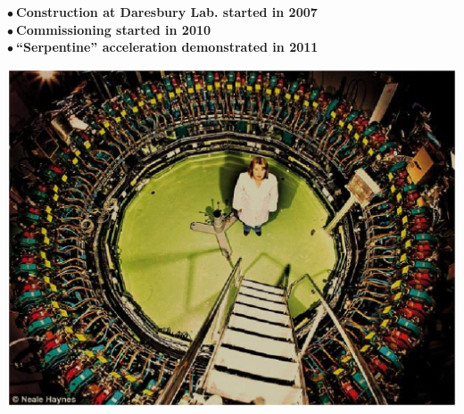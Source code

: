 \documentclass[12pt]{article}
\newcommand{\nib}{\noindent \ensuremath{\bullet~}}
\newcommand{\blue}{\color{blue}}
\begin{document}
\begin{minipage}{.5\linewidth}

{\Large \blue \bf
\noindent
\nib Construction at Daresbury Lab.  started in 2007 \\[1ex]
\nib Commissioning started in 2010 \\[1ex]
\nib ``Serpentine'' acceleration demonstrated in 2011 \\[1ex]
}


\hspace{-10mm}
\includegraphics*[width=15cm]{./figs_FFAG_introSlides/EMMA_lowResol.eps}

\end{minipage}\hfill
\end{document}
